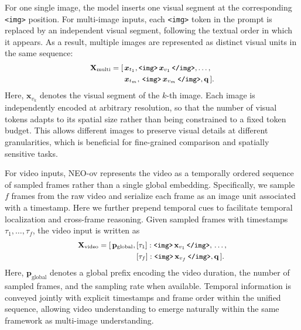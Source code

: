 \documentclass[11pt]{article}
\begin{document}
For one single image, the model inserts one visual segment at the corresponding \texttt{<img>} position. For multi-image inputs, each \texttt{<img>} token in the prompt is replaced by an independent visual segment, following the textual order in which it appears. As a result, multiple images are represented as distinct visual units in the same sequence:
\begin{equation}
\small
\begin{split}
\mathbf{X}_{\text{multi}} = [&\,\boldsymbol{x}_{t_1},
\texttt{<img>} \,\boldsymbol{x}_{v_1}\, \texttt{</img>},
\ldots, \\
&\,\boldsymbol{x}_{t_m}, 
\,\texttt{<img>} \,\boldsymbol{x}_{v_m}\, \texttt{</img>},
\mathbf{q}\,].
\end{split}
\end{equation}
Here, $\boldsymbol{x}_{v_k}$ denotes the visual segment of the $k$-th image. Each image is independently encoded at arbitrary resolution, so that the number of visual tokens adapts to its spatial size rather than being constrained to a fixed token budget. This allows different images to preserve visual details at different granularities, which is beneficial for fine-grained comparison and spatially sensitive tasks.

For video inputs, NEO-ov represents the video as a temporally ordered sequence of sampled frames rather than a single global embedding. Specifically, we sample $f$ frames from the raw video and serialize each frame as an image unit associated with a timestamp. Here we further prepend temporal cues to facilitate temporal localization and cross-frame reasoning.
Given sampled frames with timestamps $\tau_1,\ldots,\tau_f$, the video input is written as
\begin{equation}
\small
\begin{split}
\mathbf{X}_{\text{video}} = [\,\mathbf{p}_{\text{global}}, &\,[\tau_1]:
\texttt{<img>} \,\mathbf{x}_{v_1}\, \texttt{</img>}, \,\ldots, \\
&\,[\tau_f]:
\texttt{<img>} \,\mathbf{x}_{v_f}\, \texttt{</img>},
\mathbf{q}\,].
\end{split}
\end{equation}
Here, $\mathbf{p}_{\text{global}}$ denotes a global prefix encoding the video duration, the number of sampled frames, and the sampling rate when available. Temporal information is conveyed jointly with explicit timestamps and frame order within the unified sequence, allowing video understanding to emerge naturally within the same framework as multi-image understanding.
\end{document}
